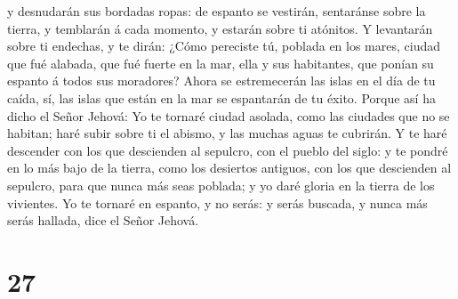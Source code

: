 y desnudarán sus bordadas ropas: de espanto se vestirán, sentaránse
sobre la tierra, y temblarán á cada momento, y estarán sobre ti
atónitos.  Y levantarán sobre ti endechas, y te dirán:
¿Cómo pereciste tú, poblada en los mares, ciudad que fué alabada, que
fué fuerte en la mar, ella y sus habitantes, que ponían su espanto á
todos sus moradores?  Ahora se estremecerán las islas en el
día de tu caída, sí, las islas que están en la mar se espantarán de tu
éxito.  Porque así ha dicho el Señor Jehová: Yo te tornaré
ciudad asolada, como las ciudades que no se habitan; haré subir sobre ti
el abismo, y las muchas aguas te cubrirán.  Y te haré
descender con los que descienden al sepulcro, con el pueblo del siglo: y
te pondré en lo más bajo de la tierra, como los desiertos antiguos, con
los que descienden al sepulcro, para que nunca más seas poblada; y yo
daré gloria en la tierra de los vivientes.  Yo te tornaré
en espanto, y no serás: y serás buscada, y nunca más serás hallada, dice
el Señor Jehová.

\hypertarget{section-26}{%
\section{27}\label{section-26}}

